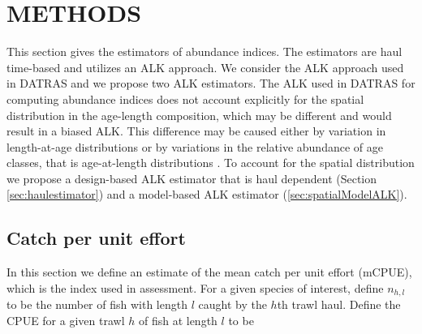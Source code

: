 \documentclass[a4paper 12pt]{article}
\numberwithin{equation}{section}
\begin{document}
\section{\large METHODS}
\label{sec:methods}
This section gives the estimators of abundance indices. The estimators are haul time-based and utilizes an ALK approach. We consider the ALK approach used in DATRAS and we propose two ALK estimators. The ALK used in DATRAS for computing abundance indices does not account explicitly for the spatial distribution in the age-length composition, which may be different and would result in a biased ALK. This difference may be caused either by variation in length-at-age distributions or by variations in the relative abundance of age classes, that is age-at-length distributions \citep{gerritsen2006simple}.  To account for the spatial distribution we propose a design-based ALK estimator that is haul dependent (Section \ref{sec:haulestimator}) and a model-based ALK estimator (\ref{sec:spatialModelALK}).

\subsection{Catch per unit effort}
\label{sec:cpueestimators}
In this section we define an estimate of the mean catch per unit effort (mCPUE), which is the index used in assessment. For a given species of interest, define $n_{h,l}$ to be the number of fish with length $l$ caught by the $h$th trawl haul. Define the CPUE for a given trawl $h$ of fish at length $l$ to be 
\end{document}
